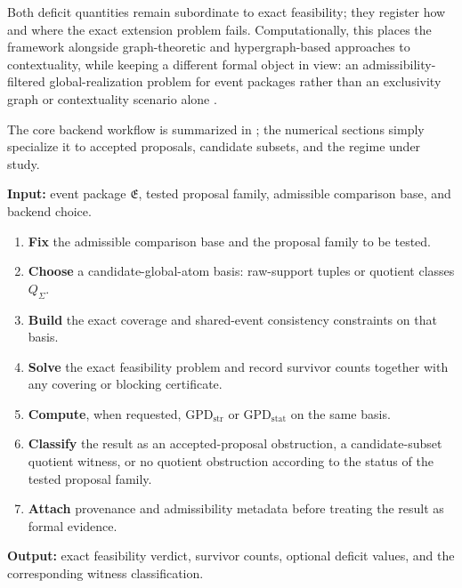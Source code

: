 \documentclass[11pt]{article}
\newcommand{\EventPackage}{\mathfrak{E}}
\newcommand{\GPDstr}{\mathrm{GPD}_{\mathrm{str}}}
\newcommand{\GPDstat}{\mathrm{GPD}_{\mathrm{stat}}}
\theoremstyle{definition}
\begin{document}
Both deficit quantities remain subordinate to exact feasibility; they register how and where the exact extension problem fails. Computationally, this places the framework alongside graph-theoretic and hypergraph-based approaches to contextuality, while keeping a different formal object in view: an admissibility-filtered global-realization problem for event packages rather than an exclusivity graph or contextuality scenario alone \citep{CabelloSeveriniWinter2014Graph,AcinEtAl2015Combinatorial,AbramskyBarbosaMansfield2017ContextualFraction,Schrijver1986TheoryLIP}.

The core backend workflow is summarized in ; the numerical sections simply specialize it to accepted proposals, candidate subsets, and the regime under study.

\begin{algorithm}[t]
    \caption{Exact and Quotient-Backed Backend Workflow}
    \label{alg:exact-backend-workflow}
    \small
    \textbf{Input:} event package \(\EventPackage\), tested proposal family, admissible comparison base, and backend choice. \par\smallskip
    \begin{enumerate}[leftmargin=1.8em,label=\arabic*.,itemsep=2pt,topsep=3pt]
        \item \textbf{Fix} the admissible comparison base and the proposal family to be tested.
        \item \textbf{Choose} a candidate-global-atom basis: raw-support tuples or quotient classes \(Q_\Sigma\).
        \item \textbf{Build} the exact coverage and shared-event consistency constraints on that basis.
        \item \textbf{Solve} the exact feasibility problem and record survivor counts together with any covering or blocking certificate.
        \item \textbf{Compute}, when requested, \(\GPDstr\) or \(\GPDstat\) on the same basis.
        \item \textbf{Classify} the result as an accepted-proposal obstruction, a candidate-subset quotient witness, or no quotient obstruction according to the status of the tested proposal family.
        \item \textbf{Attach} provenance and admissibility metadata before treating the result as formal evidence.
    \end{enumerate}
    \textbf{Output:} exact feasibility verdict, survivor counts, optional deficit values, and the corresponding witness classification.
\end{algorithm}
\end{document}
